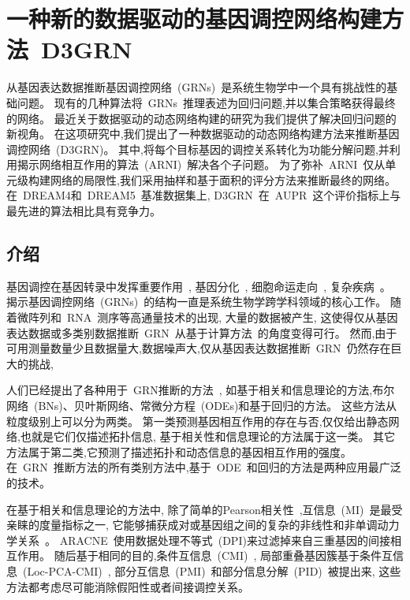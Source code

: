\section{一种新的数据驱动的基因调控网络构建方法~D3GRN}

从基因表达数据推断基因调控网络~(GRNs)~是系统生物学中一个具有挑战性的基础问题。
现有的几种算法将~GRNs~推理表述为回归问题,并以集合策略获得最终的网络。
最近关于数据驱动的动态网络构建的研究为我们提供了解决回归问题的新视角。
在这项研究中,我们提出了一种数据驱动的动态网络构建方法来推断基因调控网络~(D3GRN)。
其中,将每个目标基因的调控关系转化为功能分解问题,并利用揭示网络相互作用的算法~(ARNI)~解决各个子问题。
为了弥补~ARNI~仅从单元级构建网络的局限性,我们采用抽样和基于面积的评分方法来推断最终的网络。
在~DREAM4和~DREAM5~基准数据集上, D3GRN~在~AUPR~这个评价指标上与最先进的算法相比具有竞争力。

\subsection{介绍}
基因调控在基因转录中发挥重要作用~\cite{lee2002transcriptional,harbison2004transcriptional},
基因分化~\cite{matsumoto2017scode},
细胞命运走向~\cite{chen2014single,trapnell2014dynamics},
复杂疾病~\cite{boyle2017expanded}。
揭示基因调控网络~(GRNs)~的结构一直是系统生物学跨学科领域的核心工作。
随着微阵列和~RNA~测序等高通量技术的出现,
大量的数据被产生,
这使得仅从基因表达数据或多类别数据推断~GRN~从基于计算方法~\cite{maetschke2013supervised}的角度变得可行。
然而,由于可用测量数量少且数据量大,数据噪声大,仅从基因表达数据推断~GRN~仍然存在巨大的挑战,

人们已经提出了各种用于~GRN推断的方法~\cite{karlebach2008modelling,le2015quantitative,huynh2018gene},
如基于相关和信息理论的方法,布尔网络~(BNs)、贝叶斯网络、常微分方程~(ODEs)和基于回归的方法。
这些方法从粒度级别上可以分为两类。
第一类预测基因相互作用的存在与否,仅仅给出静态网络,也就是它们仅描述拓扑信息,
基于相关性和信息理论的方法属于这一类。
其它方法属于第二类,它预测了描述拓扑和动态信息的基因相互作用的强度。
在~GRN~推断方法的所有类别方法中,基于~ODE~和回归的方法是两种应用最广泛的技术。

在基于相关和信息理论的方法中,
除了简单的Pearson相关性~\cite{stuart2003gene},互信息~(MI)~\cite{steuer2002mutual}是最受亲睐的度量指标之一,
它能够捕获成对或基因组之间的复杂的非线性和非单调动力学关系~\cite{uda2013robustness,mc2015information}。
ARACNE~\cite{basso2005reverse}使用数据处理不等式~(DPI)来过滤掉来自三重基因的间接相互作用。
随后基于相同的目的,条件互信息~(CMI)~\cite{zhang2011inferring},
局部重叠基因簇基于条件互信息~(Loc-PCA-CMI)~\cite{8660530},
部分互信息~(PMI)~\cite{zhao2016part}和部分信息分解~(PID)~\cite{chan2017gene}被提出来,
这些方法都考虑尽可能消除假阳性或者间接调控关系。

